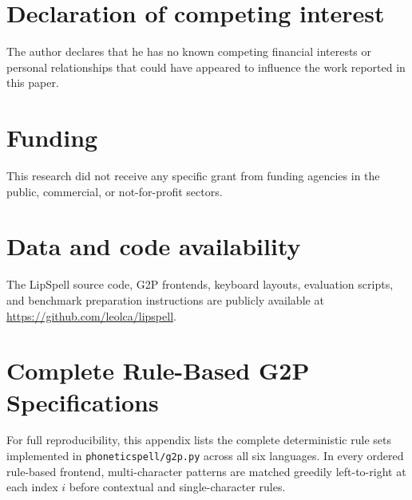 \documentclass[preprint,12pt,authoryear]{elsarticle}
\begin{document}
\section*{Declaration of competing interest}
The author declares that he has no known competing financial interests or personal relationships that could have appeared to influence the work reported in this paper.

\section*{Funding}
This research did not receive any specific grant from funding agencies in the public, commercial, or not-for-profit sectors.

\section*{Data and code availability}
The LipSpell source code, G2P frontends, keyboard layouts, evaluation scripts, and benchmark preparation instructions are publicly available at \url{https://github.com/leolca/lipspell}.




\appendix

\section{Complete Rule-Based G2P Specifications}
\label{app:g2p}
For full reproducibility, this appendix lists the complete deterministic rule sets implemented in \texttt{phoneticspell/g2p.py} across all six languages. In every ordered rule-based frontend, multi-character patterns are matched greedily left-to-right at each index $i$ before contextual and single-character rules.
\end{document}
